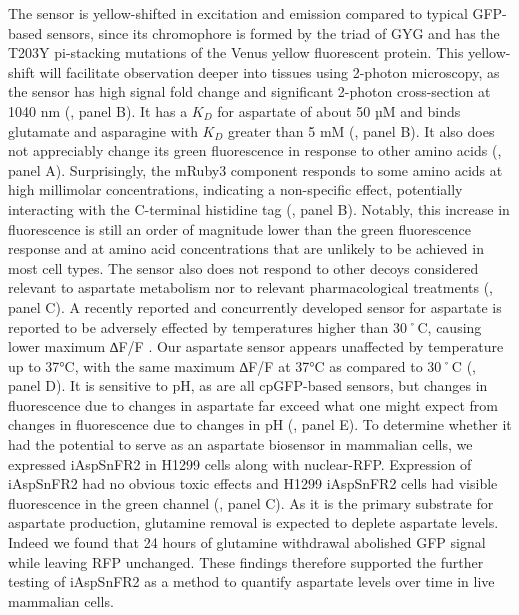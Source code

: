 \documentclass[9pt,lineno]{elife}
\begin{document}
The sensor is yellow-shifted in excitation and emission compared to typical GFP-based sensors, since its chromophore is formed by the triad of GYG and has the T203Y pi-stacking mutations of the Venus yellow fluorescent protein.
This yellow-shift will facilitate observation deeper into tissues using 2-photon microscopy, as the sensor has high signal fold change and significant 2-photon cross-section at 1040 nm (, panel B).
It has a $K_D$ for aspartate of about 50 µM and binds glutamate and asparagine with $K_D$ greater than 5 mM (, panel B).
It also does not appreciably change its green fluorescence in response to other amino acids (, panel A).
Surprisingly, the mRuby3 component responds to some amino acids at high millimolar concentrations, indicating a non-specific effect, potentially interacting with the C-terminal histidine tag (, panel B).
Notably, this increase in fluorescence is still an order of magnitude lower than the green fluorescence response and at amino acid concentrations that are unlikely to be achieved in most cell types.
The sensor also does not respond to other decoys considered relevant to aspartate metabolism nor to relevant pharmacological treatments (, panel C).
A recently reported and concurrently developed sensor for aspartate is reported to be adversely effected by temperatures higher than 30˚C, causing lower maximum ∆F/F \citep{Hellweg2023}.
Our aspartate sensor appears unaffected by temperature up to 37°C, with the same maximum ∆F/F at 37°C as compared to 30˚C (, panel D).
It is sensitive to pH, as are all cpGFP-based sensors, but changes in fluorescence due to changes in aspartate far exceed what one might expect from changes in fluorescence due to changes in pH (, panel E).
To determine whether it had the potential to serve as an aspartate biosensor in mammalian cells, we expressed iAspSnFR2 in H1299 cells along with nuclear-RFP.
Expression of iAspSnFR2 had no obvious toxic effects and H1299 iAspSnFR2 cells had visible fluorescence in the green channel (, panel C).
As it is the primary substrate for aspartate production, glutamine removal is expected to deplete aspartate levels.
Indeed we found that 24 hours of glutamine withdrawal abolished GFP signal while leaving RFP unchanged.
These findings therefore supported the further testing of iAspSnFR2 as a method to quantify aspartate levels over time in live mammalian cells.
\end{document}
